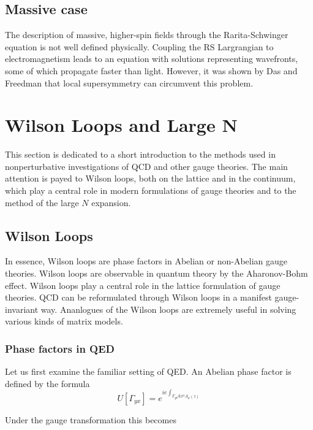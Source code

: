\subsection{Massive case}
The description of massive, higher-spin fields through the Rarita-Schwinger
equation is not well defined physically. Coupling the RS Largrangian to
electromagnetism leads to an equation with solutions representing wavefronts,
some of which propagate faster than light. However, it was shown by Das and
Freedman that local supersymmetry can circumvent this problem.



\section{Wilson Loops and Large N}
This section is dedicated to a short introduction to the methods used in
nonperturbative investigations of QCD and other gauge theories. The main
attention is payed to Wilson loops, both on the lattice and in the continuum,
which play a central role in modern formulations of gauge theories and to the
method of the large $N$ expansion.

\subsection{Wilson Loops}
In essence, Wilson loops are phase factors in Abelian or non-Abelian gauge
theories. Wilson loops are observable in quantum theory by the Aharonov-Bohm
effect. Wilson loops play a central role in the lattice formulation of gauge
theories. QCD can be reformulated through Wilson loops in a manifest
gauge-invariant way. Ananlogues of the Wilson loops are extremely useful in
solving various kinds of matrix models.
\subsubsection{Phase factors in QED}
\par Let us first examine the familiar setting of QED. An Abelian phase factor
is defined by the formula
\begin{equation}
  U\left[\Gamma_{yx}\right] = e^{ie\int_{\Gamma_{yx}\mathrm{d}z^\mu
  A_\mu(z)}}
  \label{eq:abelianphasefactor}
\end{equation}

Under the gauge transformation this becomes

